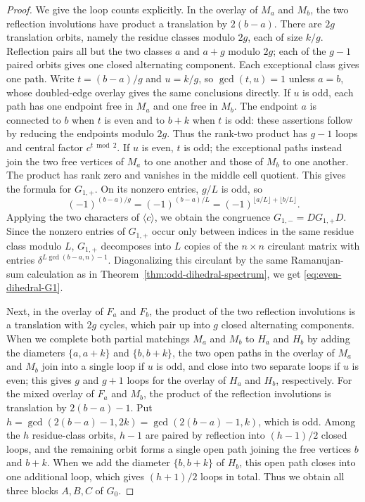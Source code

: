 \documentclass[11pt,a4paper]{amsart}
\theoremstyle{uprightdefinition}
\theoremstyle{remark}\newtheorem{remark}[theorem]{Remark}
\begin{document}
\begin{proof}
We give the loop counts explicitly.  In the overlay of $M_a$ and $M_b$,
the two reflection involutions have product a translation by $2(b-a)$.
There are $2g$ translation orbits, namely the residue classes modulo $2g$,
each of size $k/g$.  Reflection pairs all but the two classes
$a$ and $a+g$ modulo $2g$; each of the $g-1$ paired orbits gives one
closed alternating component.  Each exceptional class gives one path.
Write $t=(b-a)/g$ and $u=k/g$, so $\gcd(t,u)=1$ unless $a=b$,
whose doubled-edge overlay gives the same conclusions directly.
If $u$ is odd, each path has one endpoint free in $M_a$ and one free in
$M_b$.  The endpoint $a$ is connected to $b$ when $t$ is even and to
$b+k$ when $t$ is odd: these assertions follow by reducing the endpoints
modulo $2g$.  Thus the rank-two product has $g-1$ loops and central factor
$c^{t\bmod2}$.  If $u$ is even, $t$ is odd; the exceptional paths instead
join the two free vertices of $M_a$ to one another and those of $M_b$
to one another.  The product has rank zero and vanishes in the middle
cell quotient. This gives the formula for $G_{1,+}$. On its nonzero entries,
$g/L$ is odd, so
\[
 (-1)^{(b-a)/g}=(-1)^{(b-a)/L}
       =(-1)^{\lfloor a/L\rfloor+\lfloor b/L\rfloor}.
\]
Applying the two characters of $\langle c\rangle$, we obtain the congruence $G_{1,-}=DG_{1,+}D$.
Since the nonzero entries of $G_{1,+}$ occur only between indices in the same residue class modulo
$L$, $G_{1,+}$ decomposes into $L$ copies of the $n\times n$ circulant matrix with entries
$\delta^{L\gcd(b-a,n)-1}$. Diagonalizing this circulant by the same Ramanujan-sum calculation as in Theorem~\ref{thm:odd-dihedral-spectrum}, we get \eqref{eq:even-dihedral-G1}.

Next, in the overlay of $F_a$ and $F_b$, the product of the two reflection involutions is a translation
with $2g$ cycles, which pair up into $g$ closed alternating components. When we complete both
partial matchings $M_a$ and $M_b$ to $H_a$ and $H_b$ by adding the diameters $\{a,a+k\}$ and $\{b,b+k\}$, the two open paths in the overlay of $M_a$ and $M_b$ join
into a single loop if $u$ is odd, and close into two separate loops if $u$ is
even; this gives $g$ and $g+1$ loops for the overlay of $H_a$ and $H_b$, respectively.
For the mixed overlay of $F_a$ and $M_b$, the product of the reflection
involutions is translation by $2(b-a)-1$. Put
$h=\gcd(2(b-a)-1,2k)=\gcd(2(b-a)-1,k)$, which is odd.
Among the $h$ residue-class orbits, $h-1$ are paired by reflection into $(h-1)/2$ closed loops, and the remaining orbit forms a single open path joining the
free vertices $b$ and $b+k$. When we add the diameter $\{b,b+k\}$ of $H_b$, this open
path closes into one additional loop, which gives $(h+1)/2$ loops in total. Thus we obtain all three blocks $A,B,C$ of $G_0$.


\end{proof}
\end{document}
